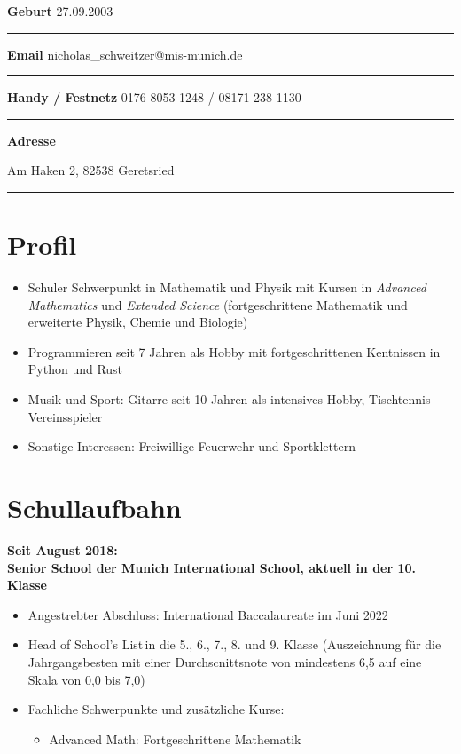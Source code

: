\documentclass[12pt]{article}
\newcommand{\sect}[1]{\vspace{-12pt}\section*{#1}\vspace{-12pt}}
\newcommand{\sep}{{\color{gray}\vspace{-12pt}\hrule}}
\begin{document}
\textbf{Geburt} \hfill{27.09.2003} \, \\
\sep
\textbf{Email} \hfill{nicholas\_schweitzer@mis-munich.de} \, \\
\sep
\textbf{Handy / Festnetz} \hfill{0176 8053 1248 / 08171 238 1130} \, \\
\sep
\textbf{Adresse} \hfill{Am Haken 2, 82538 Geretsried \, \\
  \sep

  \sect{Profil}
  \begin{itemize}
    \itemsep3pt

  \item Schuler Schwerpunkt in Mathematik und Physik mit Kursen in \textit{\glqq
    Advanced Mathematics\grqq} und \textit{\glqq Extended Science\grqq}
    (fortgeschrittene Mathematik und erweiterte Physik, Chemie und Biologie)

  \item Programmieren seit 7 Jahren als Hobby mit fortgeschrittenen Kentnissen in
    Python und Rust

  \item Musik und Sport: Gitarre seit 10 Jahren als intensives Hobby,
    Tischtennis Vereinsspieler

  \item Sonstige Interessen: Freiwillige Feuerwehr und Sportklettern

  \end{itemize}
  \vspace{-12pt}

  \sect{Schullaufbahn}

  \textbf{Seit August 2018: \\
    Senior School der Munich International School, aktuell in der 10. Klasse
  }

  \vspace{-10pt}
  \begin{itemize}
    \itemsep3pt
  \item Angestrebter Abschluss: International Baccalaureate im Juni 2022

  \item \glqq Head of School's List\grqq \,in die 5., 6., 7., 8. und 9. Klasse
    (Auszeichnung f{\"u}r die Jahrgangsbesten mit einer Durchscnittsnote von
    mindestens 6,5 auf eine Skala von 0,0 bis 7,0)

  \item Fachliche Schwerpunkte und zus{\"a}tzliche Kurse:

    \begin{itemize}
      \itemsep0pt
      \vspace{-12pt}
    \item \glqq Advanced Math\grqq: Fortgeschrittene Mathematik


\end{itemize}
\end{itemize}}
\end{document}
